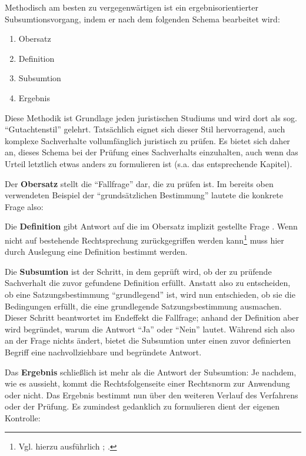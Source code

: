 Methodisch am besten zu vergegenwärtigen ist ein ergebnisorientierter Subsumtionsvorgang, indem er nach dem folgenden Schema bearbeitet wird:
\begin{enumerate}
\item Obersatz
\item Definition
\item Subsumtion
\item Ergebnis
\end{enumerate}

Diese Methodik ist Grundlage jeden juristischen Studiums und wird dort als sog. \enquote{Gutachtenstil} gelehrt. Tatsächlich eignet sich dieser Stil hervorragend, auch komplexe Sachverhalte vollumfänglich juristisch zu prüfen. Es bietet sich daher an, dieses Schema bei der Prüfung eines Sachverhalts einzuhalten, auch wenn das Urteil letztlich etwas anders zu formulieren ist (s.a. das entsprechende Kapitel).

Der \textbf{Obersatz} stellt die \enquote{Fallfrage} dar, die zu prüfen ist. Im bereits oben verwendeten Beispiel der \enquote{grundsätzlichen Bestimmung} lautete die konkrete Frage also: 

Die \textbf{Definition} gibt Antwort auf die im Obersatz implizit gestellte Frage . Wenn nicht auf bestehende Rechtsprechung zurückgegriffen werden kann\footnote{Vgl. hierzu ausführlich \cite[S.~8]{LSGBB135}; \cite[S.~5]{BSG1215HS}.} muss hier durch Auslegung eine Definition bestimmt werden.

Die \textbf{Subsumtion} ist der Schritt, in dem geprüft wird, ob der zu prüfende Sachverhalt die zuvor gefundene Definition erfüllt. Anstatt also zu entscheiden, ob eine Satzungsbestimmung \enquote{grundlegend} ist, wird nun entschieden, ob sie die Bedingungen erfüllt, die eine grundlegende Satzungsbestimmung ausmachen. Dieser Schritt beantwortet im Endeffekt die Fallfrage; anhand der Definition aber wird begründet, warum die Antwort \enquote{Ja} oder \enquote{Nein} lautet. Während sich also an der Frage nichts ändert, bietet die Subsumtion unter einen zuvor definierten Begriff eine nachvollziehbare und begründete Antwort.

Das \textbf{Ergebnis} schließlich ist mehr als die Antwort der Subsumtion: Je nachdem, wie es aussieht, kommt die Rechtsfolgenseite einer Rechtsnorm zur Anwendung oder nicht. Das Ergebnis bestimmt nun über den weiteren Verlauf des Verfahrens oder der Prüfung. Es zumindest gedanklich zu formulieren dient der eigenen Kontrolle: 

